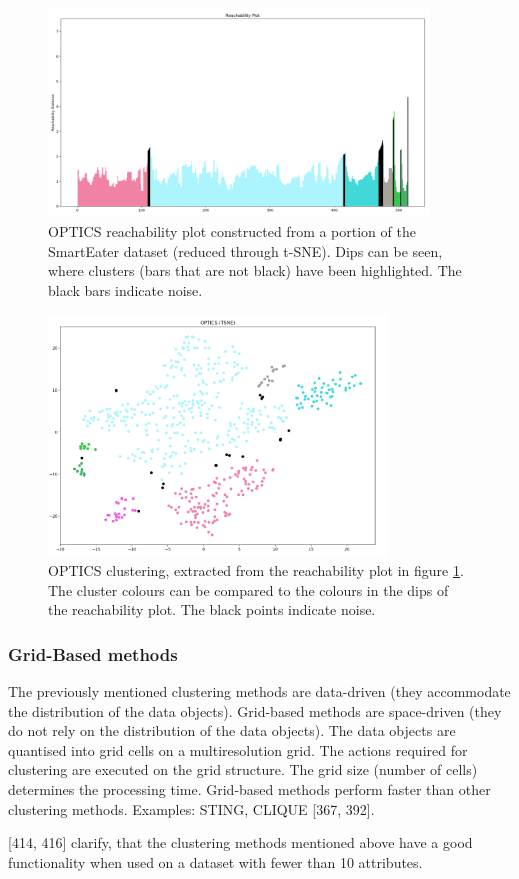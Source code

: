 \begin{figure}
  \centering
  \includegraphics[width=0.9\textwidth]{./images/OPTICS/1h-1-example-reachabilityPlot-DBSCAN-zoom.png}
  \caption{OPTICS reachability plot constructed from a portion of the SmartEater dataset (reduced through t-SNE). Dips can be seen, where clusters (bars that are not black) have been highlighted. The black bars indicate noise.}
  \label{figure:1h-1-example-reachabilityPlot-DBSCAN-zoom}
\end{figure}

\begin{figure}
  \centering
  \includegraphics[width=0.8\textwidth]{./images/OPTICS/1h-1-example-OPTICS-DBSCAN-zoom.png}
  \caption{OPTICS clustering, extracted from the reachability plot in figure \ref{figure:1h-1-example-reachabilityPlot-DBSCAN-zoom}. The cluster colours can be compared to the colours in the dips of the reachability plot. The black points indicate noise.}
  \label{figure:1h-1-example-OPTICS-DBSCAN-zoom}
\end{figure}



\subsubsection{Grid-Based methods}
The previously mentioned clustering methods are data-driven (they accommodate the distribution of the data objects). Grid-based methods are space-driven (they do not rely on the distribution of the data objects). The data objects are quantised into grid cells on a multiresolution grid. The actions required for clustering are executed on the grid structure. The grid size (number of cells) determines the processing time. Grid-based methods perform faster than other clustering methods. Examples: STING, CLIQUE \autocite{han2011data}[367, 392].



\vspace{5mm} %
\textcite{han2011data}[414, 416] clarify, that the clustering methods mentioned above have a good functionality when used on a dataset with fewer than 10 attributes. 
